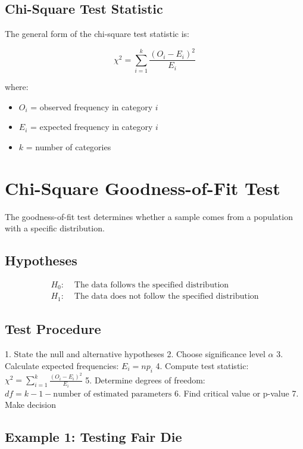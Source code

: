 \documentclass[twoside]{book}
\begin{document}
\subsection{Chi-Square Test Statistic}

The general form of the chi-square test statistic is:

\begin{equation}
\chi^2 = \sum_{i=1}^{k} \frac{(O_i - E_i)^2}{E_i}
\end{equation}

where:
\begin{itemize}
    \item $O_i$ = observed frequency in category $i$
    \item $E_i$ = expected frequency in category $i$
    \item $k$ = number of categories
\end{itemize}

\section{Chi-Square Goodness-of-Fit Test}

The goodness-of-fit test determines whether a sample comes from a population with a specific distribution.

\subsection{Hypotheses}

\begin{align}
H_0: &\text{ The data follows the specified distribution} \\
H_1: &\text{ The data does not follow the specified distribution}
\end{align}

\subsection{Test Procedure}

1. State the null and alternative hypotheses
2. Choose significance level $\alpha$
3. Calculate expected frequencies: $E_i = np_i$
4. Compute test statistic: $\chi^2 = \sum_{i=1}^{k} \frac{(O_i - E_i)^2}{E_i}$
5. Determine degrees of freedom: $df = k - 1 - \text{number of estimated parameters}$
6. Find critical value or p-value
7. Make decision

\subsection{Example 1: Testing Fair Die}
\end{document}
